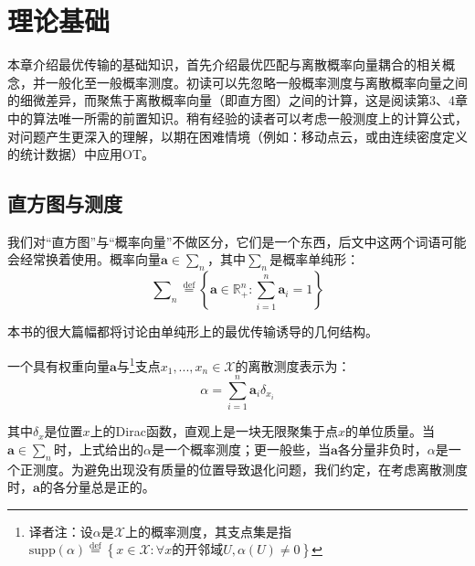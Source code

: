 \documentclass[cn,10pt,math=newtx,citestyle=gb7714-2015,bibstyle=gb7714-2015]{elegantbook}
\begin{document}
\chapter{理论基础}
本章介绍最优传输的基础知识，首先介绍最优匹配与离散概率向量耦合的相关概念，并一般化至一般概率测度。初读可以先忽略一般概率测度与离散概率向量之间的细微差异，而聚焦于离散概率向量（即直方图）之间的计算，这是阅读第3、4章中的算法唯一所需的前置知识。稍有经验的读者可以考虑一般测度上的计算公式，对问题产生更深入的理解，以期在困难情境（例如：移动点云，或由连续密度定义的统计数据）中应用OT。

\section{直方图与测度}

我们对“直方图”与“概率向量”不做区分，它们是一个东西，后文中这两个词语可能会经常换着使用。概率向量$\mathbf{a}\in\sum_n$，其中$\sum_n$是概率单纯形：
\begin{equation*}
    \sum\nolimits_n \overset{\text{def}}{=} \left\{ \mathbf{a}\in\mathbb{R}_+^n:\sum_{i=1}^n\mathbf{a}_i=1 \right\}
\end{equation*}

本书的很大篇幅都将讨论由单纯形上的最优传输诱导的几何结构。

\begin{postulate}[离散测度]

一个具有权重向量$\mathbf{a}$与\footnote{译者注：设$\alpha$是$\mathcal{X}$上的概率测度，其支点集是指$\text{supp}(\alpha)\overset{\text{def}}{=}\left\{x\in\mathcal{X}:\forall x\text{的开邻域}U, \alpha(U)\neq 0\right\}$}支点$x_1,...,x_n\in\mathcal{X}$的离散测度表示为：
\begin{equation}
    \label{2.1}
    \alpha=\sum_{i=1}^n \mathbf{a}_i\delta_{x_i}
\end{equation}

其中$\delta_{x}$是位置$x$上的Dirac函数，直观上是一块无限聚集于点$x$的单位质量。当$\mathbf{a}\in\sum_n$时，上式给出的$\alpha$是一个概率测度；更一般些，当$\mathbf{a}$各分量非负时，$\alpha$是一个正测度。为避免出现没有质量的位置导致退化问题，我们约定，在考虑离散测度时，$\mathbf{a}$的各分量总是正的。

\end{postulate}
\end{document}
